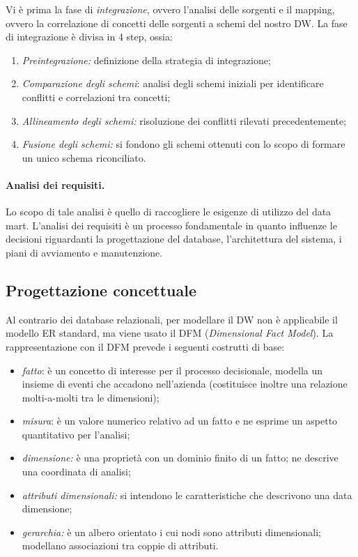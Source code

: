 \documentclass[a4paper, 10pt]{article}
\begin{document}
	Vi è prima la fase di \textit{integrazione}, ovvero l'analisi delle sorgenti e il mapping, ovvero la correlazione di concetti delle sorgenti a schemi del nostro DW. La fase di integrazione è divisa in 4 step, ossia: \begin{enumerate}
		\item \textit{Preintegrazione: } definizione della strategia di integrazione;
		\item \textit{Comparazione degli schemi}: analisi degli schemi iniziali per identificare conflitti e correlazioni tra concetti;
		\item \textit{Allineamento degli schemi:} risoluzione dei conflitti rilevati precedentemente;
		\item \textit{Fusione degli schemi:} si fondono gli schemi ottenuti con lo scopo di formare un unico schema riconciliato.
	\end{enumerate}

	\paragraph{Analisi dei requisiti.} Lo scopo di tale analisi è quello di raccogliere le esigenze di utilizzo del data mart.
	L'analisi dei requisiti è un processo fondamentale in quanto influenze le decisioni riguardanti la progettazione del database, l'architettura del sistema, i piani di avviamento e manutenzione.
	
	\subsection{Progettazione concettuale}
	Al contrario dei database relazionali, per modellare il DW non è applicabile il modello ER standard, ma viene usato il DFM (\textit{Dimensional Fact Model}). La rappresentazione con il DFM prevede i seguenti costrutti di base: \begin{itemize}
		\item \textit{fatto}: è un concetto di interesse per il processo decisionale, modella un insieme di eventi che accadono nell'azienda (costituisce inoltre una relazione molti-a-molti tra le dimensioni);
		\item \textit{misura}: è un valore numerico relativo ad un fatto e ne esprime un aspetto quantitativo per l'analisi;
		\item \textit{dimensione:} è una proprietà con un dominio finito di un fatto; ne descrive una coordinata di analisi;
		\item \textit{attributi dimensionali:} si intendono le caratteristiche che descrivono una data dimensione;
		\item \textit{gerarchia:} è un albero orientato i cui nodi sono attributi dimensionali; modellano associazioni tra coppie di attributi.
	\end{itemize}
\end{document}
